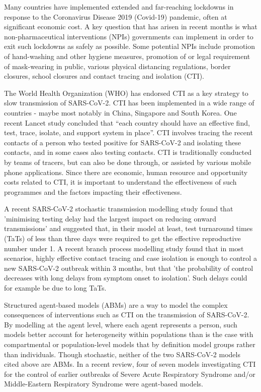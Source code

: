 \documentclass{article}
\begin{document}
Many countries have implemented extended and far-reaching lockdowns in response
to the Coronavirus Disease 2019 (Covid-19) pandemic, often at significant
economic cost. A key question that has arisen in recent months is what
non-pharmaceutical interventions (NPIs) governments can implement in order to
exit such lockdowns as safely as possible.\cite{Han2020} Some potential NPIs
include promotion of hand-washing and other hygiene measures, promotion of or
legal requirement of mask-wearing in public, various physical distancing
regulations, border closures, school closures and contact tracing and isolation
(CTI).\cite{Flaxman2020}

The World Health Organization (WHO) has endorsed CTI as a key strategy to slow
transmission of SARS-CoV-2.\cite{WHO2020} CTI has been implemented in a wide
range of countries - maybe most notably in China, Singapore and South
Korea.\cite{Fisher2020, Lee2020, Lee2020b} One recent Lancet study concluded
that “each country should have an effective find, test, trace, isolate, and
support system in place”.\cite{Han2020} CTI involves tracing the recent contacts
of a person who tested positive for SARS-CoV-2 and isolating these contacts, and
in some cases also testing contacts. CTI is traditionally conducted by teams of
tracers, but can also be done through, or assisted by various mobile phone
applications. Since there are economic, human resource and opportunity costs
related to CTI, it is important to understand the effectiveness of such
programmes and the factors impacting their effectiveness.

A recent SARS-CoV-2 stochastic transmission modelling study found that
'minimising testing delay had the largest impact on reducing onward
transmissions' and suggested that, in their model at least, test turnaround
times (TaTs) of less than three days were required to get the effective
reproductive number under 1.\cite{Kretzschmar2020} A recent branch process
modelling study found that in most scenarios, highly effective contact tracing
and case isolation is enough to control a new SARS-CoV-2 outbreak within 3
months, but that 'the probability of control decreases with long delays from
symptom onset to isolation'.\cite{Hellewell2020} Such delays could for example
be due to long TaTs.

Structured agent-based models (ABMs) are a way to model the complex consequences
of interventions such as CTI on the transmission of SARS-CoV-2. By modelling at
the agent level, where each agent represents a person, such models better
account for heterogeneity within populations than is the case with compartmental
or population-level models that by definition model groups rather than
individuals. Though stochastic, neither of the two SARS-CoV-2 models cited above
are ABMs. In a recent review, four of seven models investigating CTI for the
control of earlier outbreaks of Severe Acute Respiratory Syndrome and/or
Middle-Eastern Respiratory Syndrome were agent-based models.\cite{Kwok2019}
\end{document}
